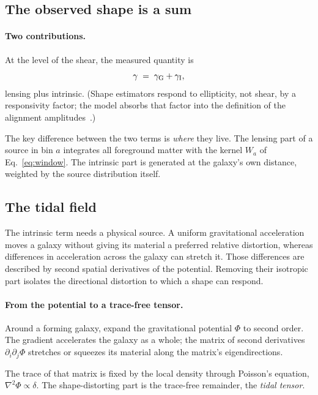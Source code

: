 \documentclass[11pt]{article}
\numberwithin{equation}{section}
\begin{document}
\subsection{The observed shape is a sum}
\label{sec:gsum}

\paragraph{Two contributions.}
At the level of the shear, the measured quantity is
\begin{equation}
  \gamma \;=\; \gamma_{\rm G} + \gamma_{\rm I} ,
  \label{eq:gsum}
\end{equation}
lensing plus intrinsic.  (Shape estimators respond to ellipticity,
not shear, by a responsivity factor; the model absorbs that factor
into the definition of the alignment amplitudes~\cite{GomesTATT}.)

The key difference between the two terms is \emph{where} they live.
The lensing part of a source in bin $a$ integrates all foreground
matter with the kernel $W_a$ of Eq.~\eqref{eq:window}.  The
intrinsic part is generated at the galaxy's own distance, weighted
by the source distribution itself.

\subsection{The tidal field}
\label{sec:tidal}

The intrinsic term needs a physical source. A uniform gravitational
acceleration moves a galaxy without giving its material a preferred
relative distortion, whereas differences in acceleration across the
galaxy can stretch it. Those differences are described by second
spatial derivatives of the potential. Removing their isotropic part
isolates the directional distortion to which a shape can respond.

\paragraph{From the potential to a trace-free tensor.}
Around a forming galaxy, expand the gravitational potential $\Phi$
to second order.  The gradient accelerates the galaxy as a whole;
the matrix of second derivatives $\partial_i\partial_j\Phi$
stretches or squeezes its material along the matrix's
eigendirections.

The trace of that matrix is fixed by the local density through
Poisson's equation, $\nabla^2\Phi \propto \delta$.  The
shape-distorting part is the trace-free remainder, the \emph{tidal
tensor}.
\end{document}

